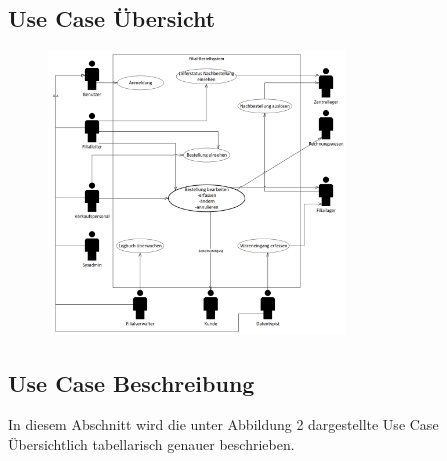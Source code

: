 \subsection{Use Case Übersicht}

\begin{figure}[H]%
\centering
\includegraphics[width=0.7\textwidth]{Images/usecase-u.png}
\label{fig:usecase}
\end{figure}


\subsection{Use Case Beschreibung}
In diesem Abschnitt wird die unter Abbildung 2 dargestellte Use Case Übersichtlich tabellarisch genauer beschrieben.








